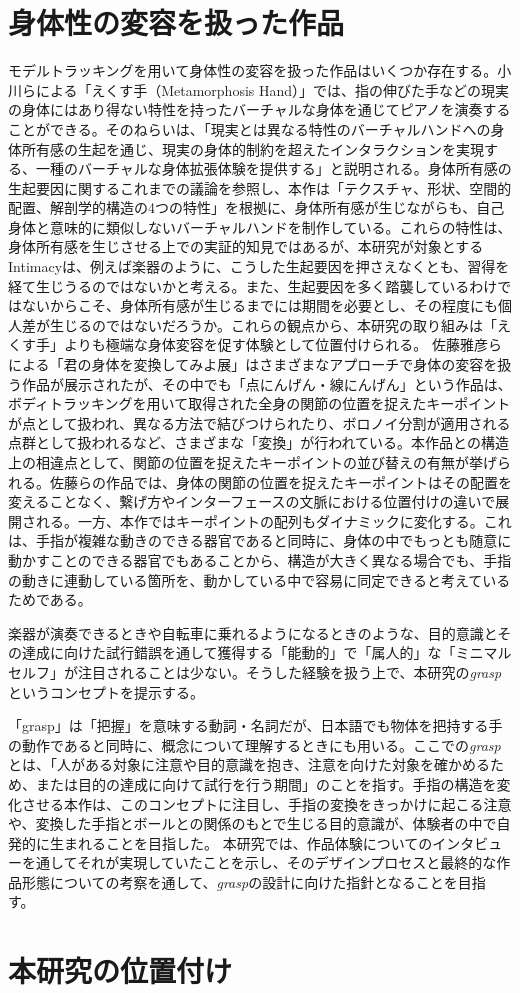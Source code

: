 \section{身体性の変容を扱った作品}
モデルトラッキングを用いて身体性の変容を扱った作品はいくつか存在する。小川らによる「えくす手（Metamorphosis Hand）」\cite{ekusute}では、指の伸びた手などの現実の身体にはあり得ない特性を持ったバーチャルな身体を通じてピアノを演奏することができる。そのねらいは、「現実とは異なる特性のバーチャルハンドへの身体所有感の生起を通じ、現実の身体的制約を超えたインタラクションを実現する、一種のバーチャルな身体拡張体験を提供する」と説明される。身体所有感の生起要因に関するこれまでの議論を参照し、本作は「テクスチャ、形状、空間的配置、解剖学的構造の4つの特性」を根拠に、身体所有感が生じながらも、自己身体と意味的に類似しないバーチャルハンドを制作している。これらの特性は、身体所有感を生じさせる上での実証的知見ではあるが、本研究が対象とするIntimacyは、例えば楽器のように、こうした生起要因を押さえなくとも、習得を経て生じうるのではないかと考える。また、生起要因を多く踏襲しているわけではないからこそ、身体所有感が生じるまでには期間を必要とし、その程度にも個人差が生じるのではないだろうか。これらの観点から、本研究の取り組みは「えくす手」よりも極端な身体変容を促す体験として位置付けられる。
佐藤雅彦らによる「君の身体を変換してみよ展」はさまざまなアプローチで身体の変容を扱う作品が展示されたが、その中でも「点にんげん・線にんげん」という作品は、ボディトラッキングを用いて取得された全身の関節の位置を捉えたキーポイントが点として扱われ、異なる方法で結びつけられたり、ボロノイ分割が適用される点群として扱われるなど、さまざまな「変換」が行われている。本作品との構造上の相違点として、関節の位置を捉えたキーポイントの並び替えの有無が挙げられる。佐藤らの作品では、身体の関節の位置を捉えたキーポイントはその配置を変えることなく、繋げ方やインターフェースの文脈における位置付けの違いで展開される。一方、本作ではキーポイントの配列もダイナミックに変化する。これは、手指が複雑な動きのできる器官であると同時に、身体の中でもっとも随意に動かすことのできる器官でもあることから、構造が大きく異なる場合でも、手指の動きに連動している箇所を、動かしている中で容易に同定できると考えているためである。


楽器が演奏できるときや自転車に乗れるようになるときのような、目的意識とその達成に向けた試行錯誤を通して獲得する「能動的」で「属人的」な「ミニマルセルフ」が注目されることは少ない。そうした経験を扱う上で、本研究の\textit{grasp}というコンセプトを提示する。

「grasp」は「把握」を意味する動詞・名詞だが、日本語でも物体を把持する手の動作であると同時に、概念について理解するときにも用いる。ここでの\textit{grasp}とは、「人がある対象に注意や目的意識を抱き、注意を向けた対象を確かめるため、または目的の達成に向けて試行を行う期間」のことを指す。手指の構造を変化させる本作は、このコンセプトに注目し、手指の変換をきっかけに起こる注意や、変換した手指とボールとの関係のもとで生じる目的意識が、体験者の中で自発的に生まれることを目指した。
本研究では、作品体験についてのインタビューを通してそれが実現していたことを示し、そのデザインプロセスと最終的な作品形態についての考察を通して、\textit{grasp}の設計に向けた指針となることを目指す。

\section{本研究の位置付け}
